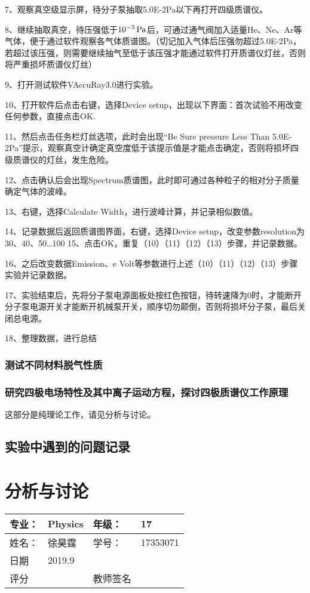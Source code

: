 \documentclass{ctexart}
\begin{document}
7、观察真空级显示屏，待分子泵抽取5.0E-2Pa以下再打开四级质谱仪。

8、继续抽取真空，待压强低于$10^{-3}\,\mathrm{Pa}$后，可通过通气阀加入适量He、Ne、Ar等气体，便于通过软件观察各气体质谱图。（切记加入气体后压强勿超过5.0E-2Pa，若超过该压强，则需要继续抽气至低于该压强才能通过软件打开质谱仪灯丝，否则将严重损坏质谱仪灯丝）

9、打开测试软件VAccuRay3.0进行实验。

10、打开软件后点击右键，选择Device setup，出现以下界面：首次试验不用改变任何参数，直接点击OK.

11、然后点击任务栏灯丝选项，此时会出现“Be Sure pressure Less Than 5.0E-2Pa”提示，观察真空计确定真空度低于该提示值是才能点击确定，否则将损坏四级质谱仪的灯丝，发生危险。

12、点击确认后会出现Spectrum质谱图，此时即可通过各种粒子的相对分子质量确定气体的波峰。

13、右键，选择Calculate Width，进行波峰计算，并记录相似数值。

14、记录数据后返回质谱图界面，右键，选择Device setup，改变参数resolution为30、40、50…100
15、点击OK，重复（10）（11）（12）（13）步骤，并记录数据。

16、之后改变数据Emission、e Volt等参数进行上述（10）（11）（12）（13）步骤实验并记录数据。

17、实验结束后，先将分子泵电源面板处按红色按钮，待转速降为0时，才能断开分子泵电源开关才能断开机械泵开关，顺序切勿颠倒，否则将损坏分子泵，最后关闭总电源。

18、整理数据，进行总结

\subsubsection{测试不同材料脱气性质}
\subsubsection{研究四极电场特性及其中离子运动方程，探讨四极质谱仪工作原理}
这部分是纯理论工作，请见分析与讨论。
\subsection{实验中遇到的问题记录}
\newpage
\section{分析与讨论}
\begin{tabular}{|p{8em}|p{8em}|p{8em}|p{8em}|}
	\hline 
	专业：     &Physics       &年级：      & 17     \\
	\hline
	姓名：& 徐昊霆 &学号：&17353071  \\
	\hline
	日期&     2019.9               & &  \\
	\hline	
	评分 & & 教师签名 & \\
	\hline
\end{tabular}
\end{document}
